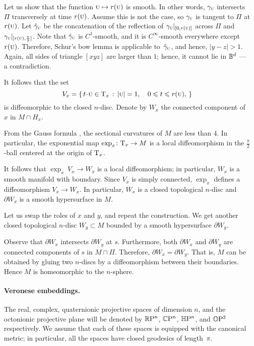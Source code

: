 \documentclass[a4paper,10pt]{article}
\begin{document}
Let us show that the function ${{\normalfont\textsc{u}}}\mapsto r({{\normalfont\textsc{u}}})$ is smooth.
In other words, $\gamma_{{\normalfont\textsc{u}}}$ intersects $\Pi$ transversely at time $r({{\normalfont\textsc{u}}})$.
Assume this is not the case, so $\gamma_{{\normalfont\textsc{u}}}$ is tangent to $\Pi$ at $r({{\normalfont\textsc{u}}})$.
Let $\hat\gamma_{{\normalfont\textsc{u}}}$ be the concatenation of the reflection of $\gamma_{{\normalfont\textsc{u}}}|_{[0,r({{\normalfont\textsc{u}}})]}$ across $\Pi$ and $\gamma_{{\normalfont\textsc{u}}}|_{[r({{\normalfont\textsc{u}}}),\frac\pi2]}$.
Note that $\hat \gamma_{{\normalfont\textsc{u}}}$ is $C^1$-smooth, and it is $C^\infty$-smooth everywhere except $r({{\normalfont\textsc{u}}})$.
Therefore, Schur's bow lemma is applicable to~$\hat \gamma_{{\normalfont\textsc{u}}}$, and hence, $|y-z|>1$.
Again, all sides of triangle $[xyz]$ are larger than $1$;
hence, it cannot lie in $\mathbb{B}^d$ --- a contradiction.  

It follows that the set 
\[V_x=\set{t\cdot {\mathsc{u}}\in \T_x}{|{\mathsc{u}}|=1,\quad 0\le t\le r({\mathsc{u}}),}\]
is diffeomorphic to the closed $n$-disc.
Denote by $W_x$ the connected component of $x$ in $M\cap H_x$.

From the Gauss formula \cite[Lemma 5]{petrunin2024}, the sectional curvatures of $M$ are less than $4$.
In particular, the exponential map $\exp_x\colon\mathrm{T}_x\to M$ is a local diffeomorphism in the $\tfrac\pi2$-ball centered at the origin of $\mathrm{T}_x$.

It follows that $\exp_x\:V_x\to W_x$ is a local diffeomorphism;
in particular, $W_x$ is a smooth manifold with boundary.
Since $V_x$ is simply connected, $\exp_x$ defines a diffeomorphism $V_x\to W_x$.
In particular, $W_x$ is a closed topological $n$-disc and $\partial W_x$ is a smooth hypersurface in $M$.

Let us swap the roles of $x$ and $y$, and repeat the construction.
We get another closed topological $n$-disc $W_y\subset M$ bounded by a smooth hypersurface $\partial W_y$.

Observe that $\partial W_x$ intersects $\partial W_y$ at $s$.
Furthermore, both $\partial W_x$ and $\partial W_y$ are connected components of $s$ in $M\cap \Pi$.
Therefore, $\partial W_x=\partial W_y$.
That is, $M$ can be obtained by gluing two $n$-discs by a diffeomorphism between their boundaries.
Hence $M$ is homeomorphic to the $n$-sphere.
\qeds

\paragraph{Veronese embeddings.}\label{veronese}
The real, complex, quaternionic projective spaces of dimension $n$, and the octonionic projective plane
will be denoted by $\mathbb{R}\mathrm{P}^n$, $\mathbb{C}\mathrm{P}^n$, $\mathbb{H}\mathrm{P}^n$, and $\mathbb{O}\mathrm{P}^2$ respectively.
We assume that each of these spaces is equipped with the canonical metric;
in particular, all the spaces have closed geodesics of length~$\pi$.
\end{document}
